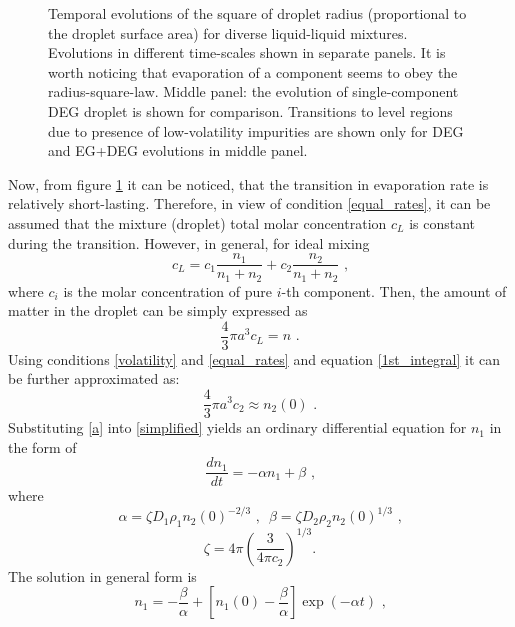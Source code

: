 \documentclass[twoside,twocolumn,9pt]{article}
\begin{document}
\begin{figure}[htb]
 \centering
{}
 \caption{Temporal evolutions of the square of droplet radius (proportional to the droplet surface area) for diverse liquid-liquid mixtures. Evolutions in different time-scales shown in separate panels. It is worth noticing that evaporation of a component seems to obey the radius-square-law. Middle panel: the evolution of single-component DEG droplet is shown for comparison. Transitions to level regions due to presence of low-volatility impurities are shown only for DEG and EG+DEG evolutions in middle panel.}
 \label{kinks}
\end{figure}
Now, from figure \ref{kinks} it can be noticed, that the transition in evaporation rate is relatively short-lasting. Therefore, in view of condition \ref{equal_rates}, it can be assumed that the mixture (droplet) total molar concentration $c_L$ is constant during the transition. However, in general, for ideal mixing
\begin{equation}
c_L = c_1 \frac{n_1}{n_1+n_2} + c_2 \frac{n_2}{n_1+n_2} \mbox{~,}
\label{c_L}
\end{equation}
where $c_i$ is the molar concentration of pure $i$-th component.
Then, the amount of matter in the droplet can be simply expressed as
\begin{equation}
\frac{4}{3}\pi a^3 c_L = n  \mbox{~.}
\label{amount}
\end{equation}
Using conditions \ref{volatility} and \ref{equal_rates} and equation \ref{1st_integral} it can be further approximated as:
\begin{equation}
\frac{4}{3}\pi a^3 c_2 \approx n_{2}(0)  \mbox{~.}
\label{a}
\end{equation}
Substituting \ref{a} into \ref{simplified} yields an ordinary differential equation for $n_1$ in the form of
\begin{equation}
\frac{dn_1}{dt} = -\alpha n_1 + \beta  \mbox{~,}
\label{n1}
\end{equation}
where
\begin{equation*}
\alpha = \zeta D_1 \rho_1 n_{2}(0)^{-2/3} \mbox{~,~~} 
\beta = \zeta D_2 \rho_2 n_{2}(0)^{1/3} \mbox{~,}
\end{equation*}
\begin{equation*}
\zeta = 4\pi \left( \frac{3}{4\pi c_2} \right) ^{1/3} \mbox{.}
\end{equation*}
The solution in general form is
\begin{equation}
n_1 = - \frac{\beta}{\alpha} + \left[ n_{1}(0) - \frac{\beta}{\alpha} \right] \exp \left( -\alpha t \right) \mbox{~,}
\end{equation}
\end{document}
